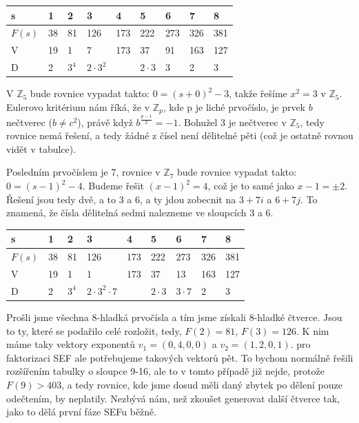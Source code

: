 \begin{exercise}
\begin{center}
\begin{tabular}{|p{1cm}|p{1cm}|p{1cm}|p{1cm}|p{1cm}|p{1cm}|p{1cm}|p{1cm}|p{1cm}|}
\hline
s & 1 & \textbf{2} &\textbf{3} & 4 & \textbf{5} & \textbf{6} & 7 & \textbf{8}\\
\hline
\hline
$F(s)$ & 38 & 81 & 126 & 173 & 222 & 273 & 326 & 381\\
\hline
V & 19 & 1 & 7 & 173 & 37 & 91 & 163 & 127\\
\hline
D & 2  & $3^4$ & $2\cdot 3^2$  &         & $2\cdot 3$   &   3   &  2    &  3 \\
\hline
\end{tabular}
\end{center}

V $\mathbb{Z}_5$ bude rovnice vypadat takto: $0 = (s + 0)^2 - 3$, takže řešíme
$x^2 = 3$ v $\mathbb{Z}_5$.  Eulerovo kritérium nám říká, že v $\mathbb{Z}_p$,
kde p je liché prvočíslo, je prvek $b$ nečtverec ($b \neq c^2$), právě když
$b^{\frac{p-1}{2}} = -1$. Bohužel 3 je nečtverec v $\mathbb{Z}_5$, tedy rovnice
nemá řešení, a tedy žádné z čísel není dělitelné pěti (což je ostatně rovnou
vidět v tabulce).

Posledním prvočíslem je 7, rovnice v $\mathbb{Z}_7$ bude rovnice vypadat takto:
$0 = (s - 1)^2 - 4$. Budeme řešit $(x-1)^2 = 4$, což je to samé jako $x-1 = \pm
2$. Řešení jsou tedy dvě, a to 3 a 6, a ty jdou zobecnit na $3 + 7i$ a $6 + 7j$.
To znamená, že čísla dělitelná sedmi nalezneme ve sloupcích 3 a 6.

\begin{center}
\begin{tabular}{|p{1cm}|p{1cm}|p{1cm}|p{1cm}|p{1cm}|p{1cm}|p{1cm}|p{1cm}|p{1cm}|}
\hline
s & 1 & 2 &\textbf{3} & 4 & 5 & \textbf{6} & 7 & 8\\
\hline
\hline
$F(s)$ & 38 & 81 & 126 & 173 & 222 & 273 & 326 & 381\\
\hline
V & 19 & 1 & 1 & 173 & 37 & 13 & 163 & 127\\
\hline
D & 2  & $3^4$ & $2\cdot 3^2 \cdot 7$  &         & $2\cdot 3$   &   $3 \cdot 7$
&  2    &  3 \\
\hline
\end{tabular}
\end{center}

Prošli jsme všechna 8-hladká prvočísla a tím jsme získali 8-hladké čtverce. Jsou
to ty, které se podařilo celé rozložit, tedy, $F(2) = 81$, $F(3) = 126$. K nim máme 
taky vektory exponentů $v_1 = (0, 4, 0, 0)$ a $v_2 = (1, 2, 0, 1)$. pro faktorizaci
SEF ale potřebujeme takových vektorů pět. To bychom
normálně řešili rozšířením tabulky o sloupce 9-16, ale to v tomto případě již
nejde, protože $F(9) > 403$, a tedy rovnice, kde jsme dosud měli daný zbytek po
dělení pouze odečtením, by neplatily. Nezbývá nám, než zkoušet generovat další
čtverce tak, jako to dělá první fáze SEFu běžně.
\end{exercise}

